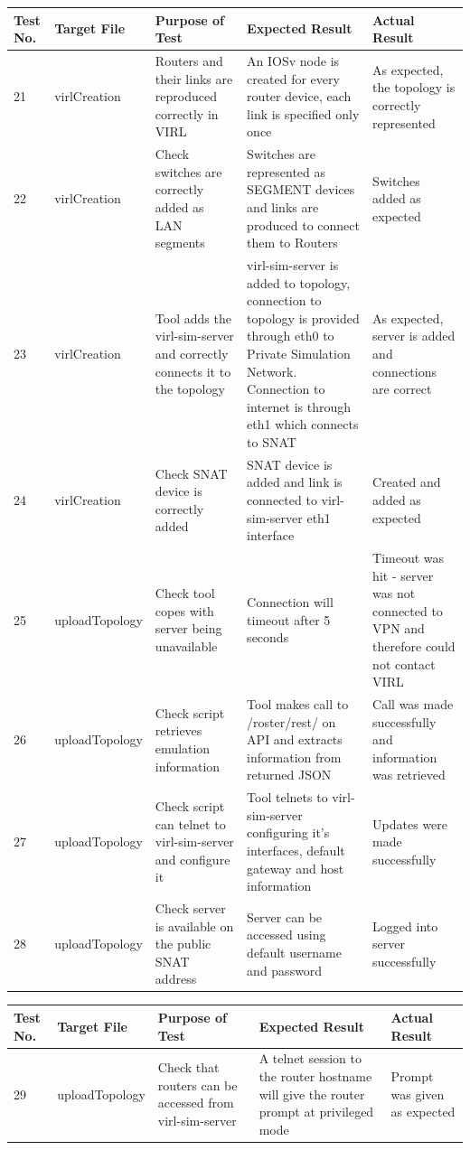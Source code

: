 \documentclass[11pt]{report}
\begin{document}
\begin{tabular}{|p{0.6cm}|p{3.0cm}|p{3cm}|p{3.5cm}|p{3.5cm}|}
	\hline \textbf{Test No.} & \textbf{Target File} & \textbf{Purpose of Test} & \textbf{Expected Result} & \textbf{Actual Result} \\ 
	\hline 21 & virlCreation & Routers and their links are reproduced correctly in VIRL & An IOSv node is created for every router device, each link is specified only once & As expected, the topology is correctly represented  \\ 
	\hline 22 & virlCreation & Check switches are correctly added as LAN segments & Switches are represented as SEGMENT devices and links are produced to connect them to Routers & Switches added as expected    \\ 
	\hline 23 & virlCreation & Tool adds the virl-sim-server and correctly connects it to the topology & virl-sim-server is added to topology, connection to topology is provided through eth0 to Private Simulation Network. Connection to internet is through eth1 which connects to SNAT & As expected, server is added and connections are correct \\ 
	\hline 24 & virlCreation & Check SNAT device is correctly added & SNAT device is added and link is connected to virl-sim-server eth1 interface & Created and added as expected   \\ 
	\hline 25 & uploadTopology & Check tool copes with server being unavailable & Connection will timeout after 5 seconds & Timeout was hit - server was not connected to VPN and therefore could not contact VIRL   \\
	\hline 26 & uploadTopology & Check script retrieves emulation information & Tool makes call to /roster/rest/ on API and extracts information from returned JSON & Call was made successfully and information was retrieved   \\
	\hline 27 & uploadTopology & Check script can telnet to virl-sim-server and configure it & Tool telnets to virl-sim-server configuring it's interfaces, default gateway and host information & Updates were made successfully \\
	\hline 28 & uploadTopology & Check server is available on the public SNAT address & Server can be accessed using default username and password & Logged into server successfully \\
	\hline
\end{tabular}

\begin{tabular}{|p{0.6cm}|p{3.0cm}|p{3cm}|p{3.5cm}|p{3.5cm}|}
	\hline \textbf{Test No.} & \textbf{Target File} & \textbf{Purpose of Test} & \textbf{Expected Result} & \textbf{Actual Result} \\ 
	\hline 29 & uploadTopology & Check that routers can be accessed from virl-sim-server & A telnet session to the router hostname will give the router prompt at privileged mode & Prompt was given as expected \\
	\hline	
\end{tabular}
\end{document}
